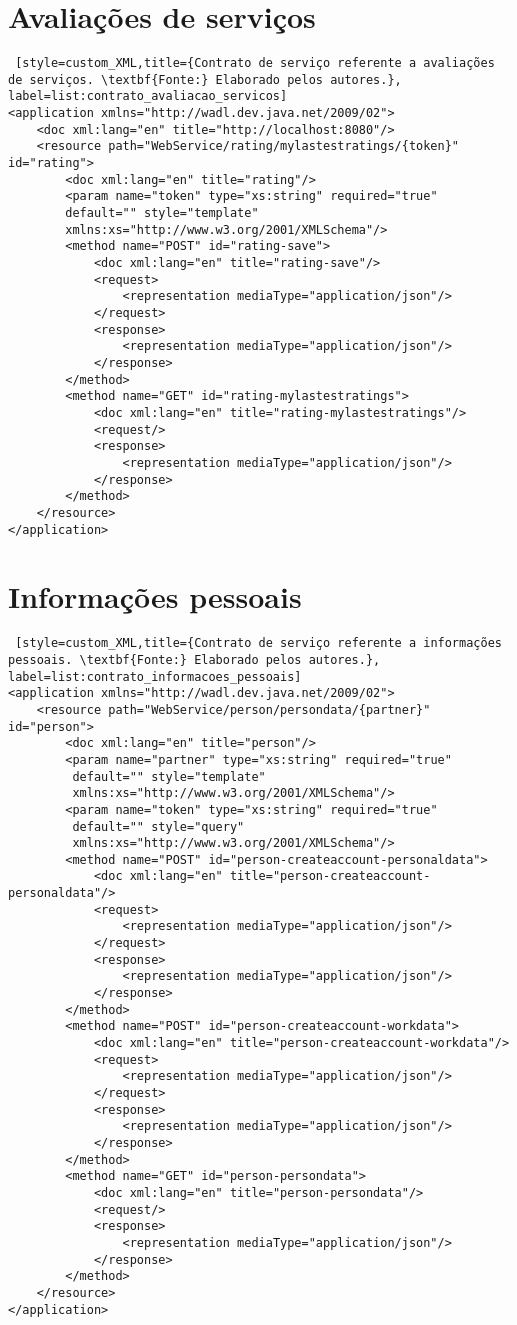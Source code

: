 \section*{Avaliações de serviços}

\begin{lstlisting} [style=custom_XML,title={Contrato de serviço referente a avaliações de serviços. \textbf{Fonte:} Elaborado pelos autores.}, label=list:contrato_avaliacao_servicos] 	
<application xmlns="http://wadl.dev.java.net/2009/02">
	<doc xml:lang="en" title="http://localhost:8080"/>
	<resource path="WebService/rating/mylastestratings/{token}" id="rating">
		<doc xml:lang="en" title="rating"/>
		<param name="token" type="xs:string" required="true" 
		default="" style="template" 
		xmlns:xs="http://www.w3.org/2001/XMLSchema"/>
		<method name="POST" id="rating-save">
			<doc xml:lang="en" title="rating-save"/>
			<request>
				<representation mediaType="application/json"/>
			</request>
			<response>
				<representation mediaType="application/json"/>
			</response>
		</method>
		<method name="GET" id="rating-mylastestratings">
			<doc xml:lang="en" title="rating-mylastestratings"/>
			<request/>
			<response>
				<representation mediaType="application/json"/>
			</response>
		</method>
	</resource>	
</application>
\end{lstlisting}

\section*{Informações pessoais}

\begin{lstlisting} [style=custom_XML,title={Contrato de serviço referente a informações pessoais. \textbf{Fonte:} Elaborado pelos autores.}, label=list:contrato_informacoes_pessoais] 	
<application xmlns="http://wadl.dev.java.net/2009/02">
	<resource path="WebService/person/persondata/{partner}" id="person">
		<doc xml:lang="en" title="person"/>
		<param name="partner" type="xs:string" required="true"
		 default="" style="template" 
		 xmlns:xs="http://www.w3.org/2001/XMLSchema"/>
		<param name="token" type="xs:string" required="true"
		 default="" style="query" 
		 xmlns:xs="http://www.w3.org/2001/XMLSchema"/>
		<method name="POST" id="person-createaccount-personaldata">
			<doc xml:lang="en" title="person-createaccount-personaldata"/>
			<request>
				<representation mediaType="application/json"/>
			</request>
			<response>
				<representation mediaType="application/json"/>
			</response>
		</method>
		<method name="POST" id="person-createaccount-workdata">
			<doc xml:lang="en" title="person-createaccount-workdata"/>
			<request>
				<representation mediaType="application/json"/>
			</request>
			<response>
				<representation mediaType="application/json"/>
			</response>
		</method>
		<method name="GET" id="person-persondata">
			<doc xml:lang="en" title="person-persondata"/>
			<request/>
			<response>
				<representation mediaType="application/json"/>
			</response>
		</method>
	</resource>
</application>
\end{lstlisting}



